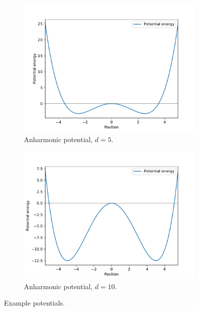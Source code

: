 \documentclass{scrartcl}
\begin{document}
\begin{figure}[H]
			\begin{subfigure}[c]{0.32\textwidth}
				\includegraphics[width=\textwidth]{../imgs/potential/anharm_5_0.pdf}
				\caption{Anharmonic potential, \newline$d=5$.}
				\label{fig:potential_anharm5}
			\end{subfigure}
			\begin{subfigure}[c]{0.32\textwidth}
				\includegraphics[width=\textwidth]{../imgs/potential/anharm_10_0.pdf}
				\caption{Anharmonic potential, \newline$d=10$.}
				\label{fig:potential_anharm10}
			\end{subfigure}
			\caption{Example potentials.}
			\label{fig:potentials}
		\end{figure}
\end{document}
